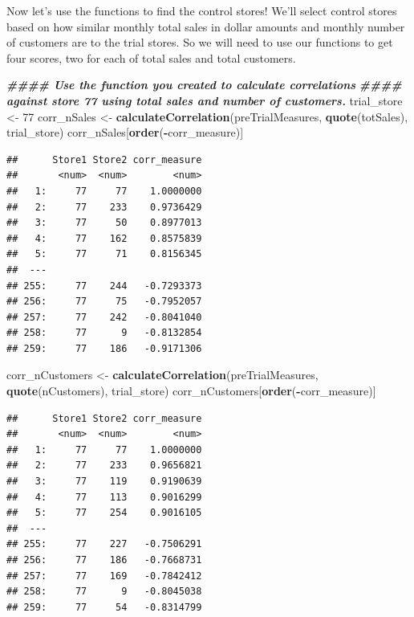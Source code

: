 \documentclass[
]{article}
\newenvironment{Shaded}{\begin{snugshade}}{\end{snugshade}}
\newcommand{\DecValTok}[1]{\textcolor[rgb]{0.00,0.00,0.81}{#1}}
\newcommand{\DocumentationTok}[1]{\textcolor[rgb]{0.56,0.35,0.01}{\textbf{\textit{#1}}}}
\newcommand{\FunctionTok}[1]{\textcolor[rgb]{0.13,0.29,0.53}{\textbf{#1}}}
\newcommand{\NormalTok}[1]{#1}
\newcommand{\OtherTok}[1]{\textcolor[rgb]{0.56,0.35,0.01}{#1}}
\newcommand{\SpecialCharTok}[1]{\textcolor[rgb]{0.81,0.36,0.00}{\textbf{#1}}}
\begin{document}
Now let's use the functions to find the control stores! We'll select
control stores based on how similar monthly total sales in dollar
amounts and monthly number of customers are to the trial stores. So we
will need to use our functions to get four scores, two for each of total
sales and total customers.

\begin{Shaded}
\begin{Highlighting}[]
\DocumentationTok{\#\#\#\# Use the function you created to calculate correlations }
\DocumentationTok{\#\#\#\# against store 77 using total sales and number of customers.}
\NormalTok{trial\_store }\OtherTok{\textless{}{-}} \DecValTok{77}
\NormalTok{corr\_nSales }\OtherTok{\textless{}{-}} \FunctionTok{calculateCorrelation}\NormalTok{(preTrialMeasures, }\FunctionTok{quote}\NormalTok{(totSales), trial\_store)}
\NormalTok{corr\_nSales[}\FunctionTok{order}\NormalTok{(}\SpecialCharTok{{-}}\NormalTok{corr\_measure)]}
\end{Highlighting}
\end{Shaded}

\begin{verbatim}
##      Store1 Store2 corr_measure
##       <num>  <num>        <num>
##   1:     77     77    1.0000000
##   2:     77    233    0.9736429
##   3:     77     50    0.8977013
##   4:     77    162    0.8575839
##   5:     77     71    0.8156345
##  ---                           
## 255:     77    244   -0.7293373
## 256:     77     75   -0.7952057
## 257:     77    242   -0.8041040
## 258:     77      9   -0.8132854
## 259:     77    186   -0.9171306
\end{verbatim}

\begin{Shaded}
\begin{Highlighting}[]
\NormalTok{corr\_nCustomers }\OtherTok{\textless{}{-}} \FunctionTok{calculateCorrelation}\NormalTok{(preTrialMeasures, }\FunctionTok{quote}\NormalTok{(nCustomers), trial\_store)}
\NormalTok{corr\_nCustomers[}\FunctionTok{order}\NormalTok{(}\SpecialCharTok{{-}}\NormalTok{corr\_measure)]}
\end{Highlighting}
\end{Shaded}

\begin{verbatim}
##      Store1 Store2 corr_measure
##       <num>  <num>        <num>
##   1:     77     77    1.0000000
##   2:     77    233    0.9656821
##   3:     77    119    0.9190639
##   4:     77    113    0.9016299
##   5:     77    254    0.9016105
##  ---                           
## 255:     77    227   -0.7506291
## 256:     77    186   -0.7668731
## 257:     77    169   -0.7842412
## 258:     77      9   -0.8045038
## 259:     77     54   -0.8314799
\end{verbatim}
\end{document}
